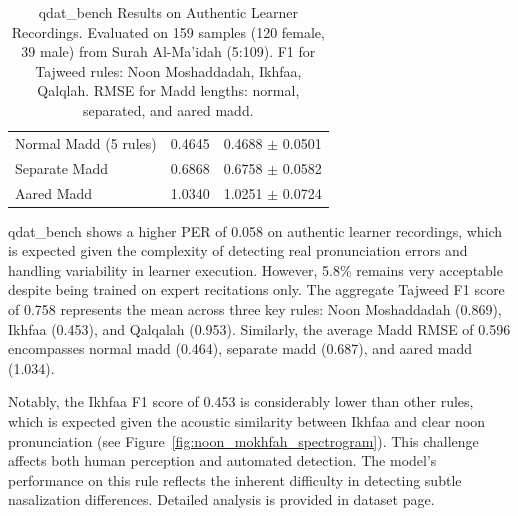 \begin{table}[htbp]
\begin{tabular}{lcc}
		\hline
		Normal Madd (5 rules)      & 0.4645            & 0.4688 $\pm$ 0.0501           \\
		Separate Madd              & 0.6868            & 0.6758 $\pm$ 0.0582           \\
		Aared Madd                 & 1.0340            & 1.0251 $\pm$ 0.0724           \\
		\hline
	\end{tabular}
	\caption{qdat\_bench Results on Authentic Learner Recordings. Evaluated on 159 samples (120 female, 39 male) from Surah Al-Ma'idah (5:109). F1 for Tajweed rules: Noon Moshaddadah, Ikhfaa, Qalqlah. RMSE for Madd lengths: normal, separated, and aared madd.}
	\vspace{3pt}
	\label{tab:qdat_bench}
\end{table}

qdat\_bench shows a higher PER of 0.058 on authentic learner recordings, which is expected given the complexity of detecting real pronunciation errors and handling variability in learner execution. However, 5.8\% remains very acceptable despite being trained on expert recitations only. The aggregate Tajweed F1 score of 0.758 represents the mean across three key rules: Noon Moshaddadah (0.869), Ikhfaa (0.453), and Qalqalah (0.953). Similarly, the average Madd RMSE of 0.596 encompasses normal madd (0.464), separate madd (0.687), and aared madd (1.034).

Notably, the Ikhfaa F1 score of 0.453 is considerably lower than other rules, which is expected given the acoustic similarity between Ikhfaa and clear noon pronunciation (see Figure~\ref{fig:noon_mokhfah_spectrogram}). This challenge affects both human perception and automated detection. The model's performance on this rule reflects the inherent difficulty in detecting subtle nasalization differences. Detailed analysis is provided in dataset page.

